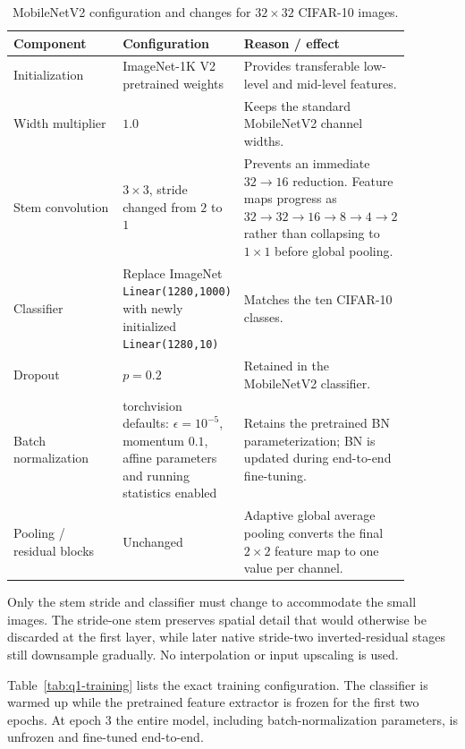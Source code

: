 \documentclass[12pt,a4paper]{article}
\begin{document}
\begin{table}[H]
    \centering
    \small
    \caption{MobileNetV2 configuration and changes for $32\times32$ CIFAR-10 images.}
    \label{tab:q1-model}
    \begin{tabular}{p{0.29\linewidth}p{0.25\linewidth}p{0.34\linewidth}}
        \toprule
        Component & Configuration & Reason / effect \\
        \midrule
        Initialization & ImageNet-1K V2 pretrained weights & Provides transferable low-level and mid-level features. \\
        Width multiplier & $1.0$ & Keeps the standard MobileNetV2 channel widths. \\
        Stem convolution & $3\times3$, stride changed from $2$ to $1$ & Prevents an immediate $32\rightarrow16$ reduction. Feature maps progress as $32\rightarrow32\rightarrow16\rightarrow8\rightarrow4\rightarrow2$ rather than collapsing to $1\times1$ before global pooling. \\
        Classifier & Replace ImageNet \texttt{Linear(1280,1000)} with newly initialized \texttt{Linear(1280,10)} & Matches the ten CIFAR-10 classes. \\
        Dropout & $p=0.2$ & Retained in the MobileNetV2 classifier. \\
        Batch normalization & torchvision defaults: $\epsilon=10^{-5}$, momentum $0.1$, affine parameters and running statistics enabled & Retains the pretrained BN parameterization; BN is updated during end-to-end fine-tuning. \\
        Pooling / residual blocks & Unchanged & Adaptive global average pooling converts the final $2\times2$ feature map to one value per channel. \\
        \bottomrule
    \end{tabular}
\end{table}

Only the stem stride and classifier must change to accommodate the small images.
The stride-one stem preserves spatial detail that would otherwise be discarded
at the first layer, while later native stride-two inverted-residual stages still
downsample gradually. No interpolation or input upscaling is used.

Table~\ref{tab:q1-training} lists the exact training configuration. The
classifier is warmed up while the pretrained feature extractor is frozen for
the first two epochs. At epoch 3 the entire model, including batch-normalization
parameters, is unfrozen and fine-tuned end-to-end.
\end{document}
